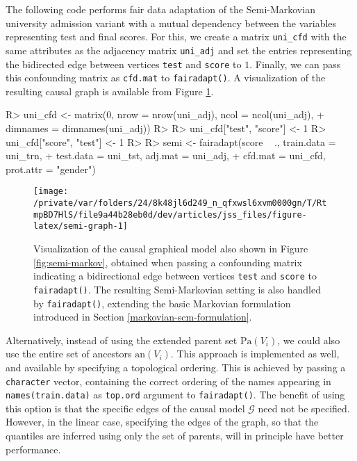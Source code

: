 \documentclass[
  nojss]{jss}
\begin{document}
The following code performs fair data adaptation of the Semi-Markovian
university admission variant with a mutual dependency between the
variables representing test and final scores. For this, we create a
matrix \texttt{uni\_cfd} with the same attributes as the adjacency
matrix \texttt{uni\_adj} and set the entries representing the bidirected
edge between vertices \texttt{test} and \texttt{score} to \(1\).
Finally, we can pass this confounding matrix as \texttt{cfd.mat} to
\texttt{fairadapt()}. A visualization of the resulting causal graph is
available from Figure \ref{fig:semi-graph}.

\begin{CodeChunk}
\begin{CodeInput}
R> uni_cfd <- matrix(0, nrow = nrow(uni_adj), ncol = ncol(uni_adj),
+                   dimnames = dimnames(uni_adj))
R> 
R> uni_cfd["test", "score"] <- 1
R> uni_cfd["score", "test"] <- 1
R> 
R> semi <- fairadapt(score ~ ., train.data = uni_trn,
+                   test.data = uni_tst, adj.mat = uni_adj,
+                   cfd.mat = uni_cfd, prot.attr = "gender")
\end{CodeInput}
\end{CodeChunk}

\begin{CodeChunk}
\begin{figure}

{\centering \texttt{[image: /private/var/folders/24/8k48jl6d249\_n\_qfxwsl6xvm0000gn/T/RtmpBD7HlS/file9a44b28eb0d/dev/articles/jss\_files/figure-latex/semi-graph-1]} 

}

\caption{Visualization of the causal graphical model also shown in Figure \ref{fig:semi-markov}, obtained when passing a confounding matrix indicating a bidirectional edge between vertices \texttt{test} and \texttt{score} to \texttt{fairadapt()}. The resulting Semi-Markovian setting is also handled by \texttt{fairadapt()}, extending the basic Markovian formulation introduced in Section \ref{markovian-scm-formulation}.}\label{fig:semi-graph}
\end{figure}
\end{CodeChunk}

Alternatively, instead of using the extended parent set
\(\mathrm{Pa}(V_i)\), we could also use the entire set of ancestors
\(\mathrm{an}(V_i)\). This approach is implemented as well, and
available by specifying a topological ordering. This is achieved by
passing a \texttt{character} vector, containing the correct ordering of
the names appearing in \texttt{names(train.data)} as \texttt{top.ord}
argument to \texttt{fairadapt()}. The benefit of using this option is
that the specific edges of the causal model \(\mathcal{G}\) need not be
specified. However, in the linear case, specifying the edges of the
graph, so that the quantiles are inferred using only the set of parents,
will in principle have better performance.
\end{document}
